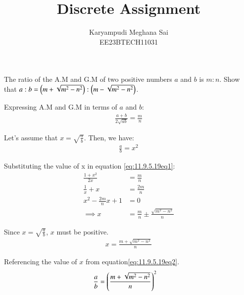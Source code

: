 \documentclass[journal,12pt,onecolumn]{IEEEtran}
\theoremstyle{remark}
\begin{document}
\let\vec\mathbf







\bigskip

\renewcommand{\thefigure}{\theenumi}
\renewcommand{\thetable}{\theenumi}


\title{Discrete Assignment}
\author{Karyampudi Meghana Sai\\ EE23BTECH11031}
\maketitle



The ratio of the A.M and G.M of two positive numbers $a$ and $b$ is $m:n$. Show that $a:b = \left( m + \sqrt{m^2 - n^2}\right) : \left( m - \sqrt{m^2 - n^2}\right)$.\\
\solution

Expressing A.M and G.M in terms of $a$ and $b$:
\begin{align}
\frac{a + b}{2\sqrt{ab}} = \frac{m}{n} \label{eq:11.9.5.19eq1}
\end{align}

Let's assume that $x = \sqrt{\frac{a}{b}}$. Then, we have:
\begin{align}
\frac{a}{b} = x^2 \label{eq:11.9.5.19eq2}
\end{align}

Substituting the value of x in equation \eqref{eq:11.9.5.19eq1}:
\begin{align}
\frac{1 + x^2}{2x} &= \frac{m}{n}\label{eq:11.9.5.19eq3} \\
\frac{1}{x} + x &= \frac{2m}{n} \label{eq:11.9.5.19eq4} \\
x^2 - \frac{2m}{n}x + 1 &=  0 \label{eq:11.9.5.19eq5}\\
\implies x &= \frac{m}{n} \pm \frac{\sqrt{m^2 - n^2}}{n} \label{eq:11.9.5.19eq6}
\end{align}

Since $x = \sqrt{\frac{a}{b}}$, $x$ must be positive.
\begin{align}
x = \frac{m + \sqrt{m^2 - n^2}}{n}\label{eq:11.9.5.19eq7}
\end{align}

Referencing the value of $x$ from equation\eqref{eq:11.9.5.19eq2}.
\begin{align}
\frac{a}{b} &=\left(\frac{m + \sqrt{m^2 - n^2}}{n}\right)^2  \label{eq:11.9.5.19eq8}
\end{align}
\end{document}
